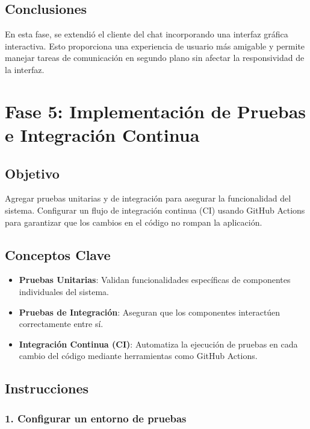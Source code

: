 \documentclass[
  a4paper,
  DIV=11,
  numbers=noendperiod,
  onepage,
  openany]{scrreprt}
\providecommand{\tightlist}{%
  \setlength{\itemsep}{0pt}\setlength{\parskip}{0pt}}\usepackage{longtable,booktabs,array}
\begin{document}
\section{Conclusiones}\label{conclusiones-16}

En esta fase, se extendió el cliente del chat incorporando una interfaz
gráfica interactiva. Esto proporciona una experiencia de usuario más
amigable y permite manejar tareas de comunicación en segundo plano sin
afectar la responsividad de la interfaz.

\chapter{Fase 5: Implementación de Pruebas e Integración
Continua}\label{fase-5-implementaciuxf3n-de-pruebas-e-integraciuxf3n-continua}

\section{Objetivo}\label{objetivo-5}

Agregar pruebas unitarias y de integración para asegurar la
funcionalidad del sistema. Configurar un flujo de integración continua
(CI) usando GitHub Actions para garantizar que los cambios en el código
no rompan la aplicación.

\section{Conceptos Clave}\label{conceptos-clave-19}

\begin{itemize}
\tightlist
\item
  \textbf{Pruebas Unitarias}: Validan funcionalidades específicas de
  componentes individuales del sistema.
\item
  \textbf{Pruebas de Integración}: Aseguran que los componentes
  interactúen correctamente entre sí.
\item
  \textbf{Integración Continua (CI)}: Automatiza la ejecución de pruebas
  en cada cambio del código mediante herramientas como GitHub Actions.
\end{itemize}

\section{Instrucciones}\label{instrucciones-15}

\subsection{1. Configurar un entorno de
pruebas}\label{configurar-un-entorno-de-pruebas}
\end{document}
